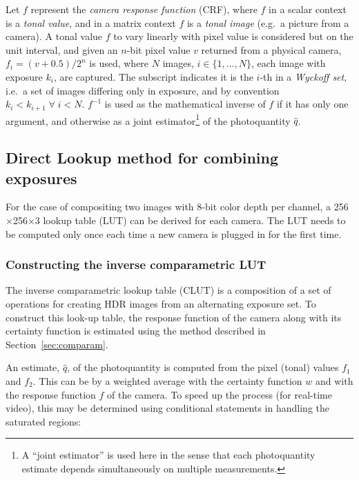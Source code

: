 Let $f$ represent the \textit{camera response
  function} (CRF), where $f$ in a scalar context is a \textit{tonal
  value}, and in a matrix context $f$ is a \textit{tonal image} (e.g.\
a picture from a camera).  A tonal value $f$ to vary
linearly with pixel value is considered but on the unit interval, and given an
$n$-bit pixel value $v$ returned from a physical camera, $f_i =
(v+0.5)/2^n$ is used, where $N$ images, $i\in\{1,\ldots,N\}$, each
image with exposure $k_i$, are captured. The subscript indicates it is the $i$-th in
a \textit{Wyckoff set}\cite{comparam}, i.e.\ a set of images differing
only in exposure, and by convention $k_{i}<k_{i+1} \;\forall\; i<N$.
$f^{-1}$ is used as the mathematical inverse of $f$ if it has only one
argument, and otherwise as a joint estimator\footnote{A ``joint
  estimator'' is used here in the sense that each photoquantity
  estimate depends simultaneously on multiple measurements.} of the
photoquantity $\hat{q}$.

 
\subsection{Direct Lookup method for combining
  exposures} \label{comp_2_lut_3}
 
For the case of compositing two images with 8-bit color depth per
channel, a 256$\times$256$\times$3 lookup table (LUT) can be derived for each camera.
The LUT needs to be computed only once each time a new camera is plugged
in for the first time.

 
\subsubsection{Constructing the inverse comparametric LUT}

The inverse comparametric lookup table (CLUT) is a composition of a set
of operations for creating HDR images from an alternating exposure
set.  To construct this look-up table, the response
function of the camera along with its certainty function is estimated using the
method described in Section~\ref{sec:comparam}.

An estimate, $\hat{q}$, of the photoquantity is computed from the
pixel (tonal) values $f_1$ and $f_2$.  This can be by a weighted average
with the certainty function $w$ and with the response function $f$ of
the camera.  To speed up the process (for real-time video), this may be
determined using conditional statements in handling the saturated regions:

